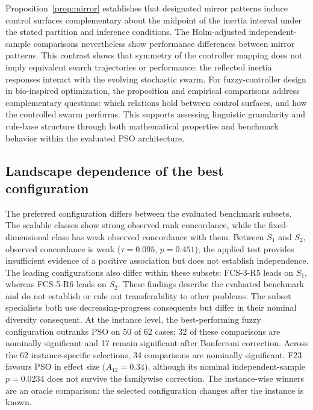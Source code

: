 Proposition~\ref{prop:mirror} establishes that designated mirror patterns induce control surfaces complementary about the midpoint of the inertia interval under the stated partition and inference conditions. The Holm-adjusted independent-sample comparisons nevertheless show performance differences between mirror patterns. This contrast shows that symmetry of the controller mapping does not imply equivalent search trajectories or performance: the reflected inertia responses interact with the evolving stochastic swarm. For fuzzy-controller design in bio-inspired optimization, the proposition and empirical comparisons address complementary questions: which relations hold between control surfaces, and how the controlled swarm performs. This supports assessing linguistic granularity and rule-base structure through both mathematical properties and benchmark behavior within the evaluated PSO architecture.

\subsection{Landscape dependence of the best configuration}
\label{subsec:discussion_landscape}

The preferred configuration differs between the evaluated benchmark subsets. The scalable classes show strong observed rank concordance, while the fixed-dimensional class has weak observed concordance with them. Between $S_1$ and $S_2$, observed concordance is weak ($\tau=0.095$, $p=0.451$); the applied test provides insufficient evidence of a positive association but does not establish independence. The leading configurations also differ within these subsets: FCS-3-R5 leads on $S_1$, whereas FCS-5-R6 leads on $S_2$. These findings describe the evaluated benchmark and do not establish or rule out transferability to other problems. The subset specialists both use decreasing-progress consequents but differ in their nominal diversity consequent. At the instance level, the best-performing fuzzy configuration outranks PSO on 50 of 62 cases; 32 of these comparisons are nominally significant and 17 remain significant after Bonferroni correction. Across the 62 instance-specific selections, 34 comparisons are nominally significant. F23 favours PSO in effect size ($A_{12}=0.34$), although its nominal independent-sample $p=0.0234$ does not survive the familywise correction. The instance-wise winners are an oracle comparison: the selected configuration changes after the instance is known.


